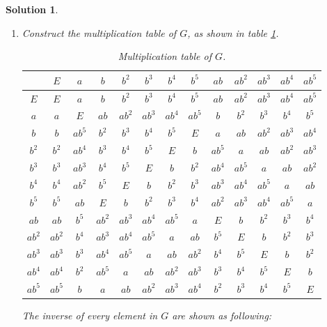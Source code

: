 \documentclass[UTF8,10pt,a4paper]{article}
\theoremstyle{Problem}
\theoremstyle{Solution}
\newtheorem*{sol}{Solution}
\begin{document}
\begin{sol}
    \begin{enumerate}
        \item[(a)] Construct the multiplication table of $G$, as shown in table \ref{5-MT}.
        \begin{table}[h]
            \centering
            \caption{Multiplication table of $G$.}
            \label{5-MT}
            \begin{tabular}{c|cccccccccccc}
             & $E$ & $a$ & $b$ & $b^2$ & $b^3$ & $b^4$ & $b^5$ & $ab$ & $ab^2$ & $ab^3$ & $ab^4$ & $ab^5$ \\ \hline
            $E$ & $E$ & $a$ & $b$ & $b^2$ & $b^3$ & $b^4$ & $b^5$ & $ab$ & $ab^2$ & $ab^3$ & $ab^4$ & $ab^5$ \\
            $a$ & $a$ & $E$ & $ab$ & $ab^2$ & $ab^3$ & $ab^4$ & $ab^5$ & $b$ & $b^2$ & $b^3$ & $b^4$ & $b^5$ \\
            $b$ & $b$ & $ab^5$ & $b^2$ & $b^3$ & $b^4$ & $b^5$ & $E$ & $a$ & $ab$ & $ab^2$ & $ab^3$ & $ab^4$ \\
            $b^2$ & $b^2$ & $ab^4$ & $b^3$ & $b^4$ & $b^5$ & $E$ & $b$ & $ab^5$ & $a$ & $ab$ & $ab^2$ & $ab^3$ \\
            $b^3$ & $b^3$ & $ab^3$ & $b^4$ & $b^5$ & $E$ & $b$ & $b^2$ & $ab^4$ & $ab^5$ & $a$ & $ab$ & $ab^2$ \\
            $b^4$ & $b^4$ & $ab^2$ & $b^5$ & $E$ & $b$ & $b^2$ & $b^3$ & $ab^3$ & $ab^4$ & $ab^5$ & $a$ & $ab$ \\
            $b^5$ & $b^5$ & $ab$ & $E$ & $b$ & $b^2$ & $b^3$ & $b^4$ & $ab^2$ & $ab^3$ & $ab^4$ & $ab^5$ & $a$ \\
            $ab$ & $ab$ & $b^5$ & $ab^2$ & $ab^3$ & $ab^4$ & $ab^5$ & $a$ & $E$ & $b$ & $b^2$ & $b^3$ & $b^4$ \\
            $ab^2$ & $ab^2$ & $b^4$ & $ab^3$ & $ab^4$ & $ab^5$ & $a$ & $ab$ & $b^5$ & $E$ & $b$ & $b^2$ & $b^3$ \\
            $ab^3$ & $ab^3$ & $b^3$ & $ab^4$ & $ab^5$ & $a$ & $ab$ & $ab^2$ & $b^4$ & $b^5$ & $E$ & $b$ & $b^2$ \\
            $ab^4$ & $ab^4$ & $b^2$ & $ab^5$ & $a$ & $ab$ & $ab^2$ & $ab^3$ & $b^3$ & $b^4$ & $b^5$ & $E$ & $b$ \\
            $ab^5$ & $ab^5$ & $b$ & $a$ & $ab$ & $ab^2$ & $ab^3$ & $ab^4$ & $b^2$ & $b^3$ & $b^4$ & $b^5$ & $E$
            \end{tabular}
            \end{table}
            The inverse of every element in $G$ are shown as following:

\end{enumerate}
\end{sol}
\end{document}
